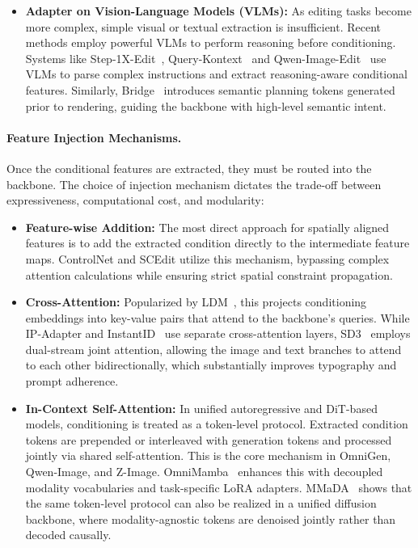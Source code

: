 \documentclass{llmxive}
\begin{document}
\begin{itemize}
    \item \textbf{Adapter on Vision-Language Models (VLMs):} As editing tasks become more complex, simple visual or textual extraction is insufficient. Recent methods employ powerful VLMs to perform reasoning before conditioning. Systems like Step-1X-Edit~\citep{liu2025step1xedit}, Query-Kontext~\citep{song2025query} and Qwen-Image-Edit~\citep{wu2025qwen} use VLMs to parse complex instructions and extract reasoning-aware conditional features. Similarly, Bridge~\citep{wang2025bridge} introduces semantic planning tokens generated prior to rendering, guiding the backbone with high-level semantic intent.
\end{itemize}

\paragraph{Feature Injection Mechanisms.}
Once the conditional features are extracted, they must be routed into the backbone. The choice of injection mechanism dictates the trade-off between expressiveness, computational cost, and modularity:
\begin{itemize}
    \item \textbf{Feature-wise Addition:} The most direct approach for spatially aligned features is to add the extracted condition directly to the intermediate feature maps. ControlNet and SCEdit utilize this mechanism, bypassing complex attention calculations while ensuring strict spatial constraint propagation.
    \item \textbf{Cross-Attention:} Popularized by LDM~\citep{rombach2022stablediffusion}, this projects conditioning embeddings into key-value pairs that attend to the backbone's queries. While IP-Adapter and InstantID~\citep{wang2024instantid} use separate cross-attention layers, SD3~\citep{esser2024stablediffusion3} employs dual-stream joint attention, allowing the image and text branches to attend to each other bidirectionally, which substantially improves typography and prompt adherence.
    \item \textbf{In-Context Self-Attention:} In unified autoregressive and DiT-based models, conditioning is treated as a token-level protocol. Extracted condition tokens are prepended or interleaved with generation tokens and processed jointly via shared self-attention. This is the core mechanism in OmniGen, Qwen-Image, and Z-Image. OmniMamba~\citep{zou2025omnimamba} enhances this with decoupled modality vocabularies and task-specific LoRA adapters. MMaDA~\citep{yang2025mmada} shows that the same token-level protocol can also be realized in a unified diffusion backbone, where modality-agnostic tokens are denoised jointly rather than decoded causally.
\end{itemize}
\end{document}
